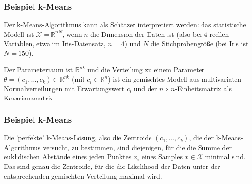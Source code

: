       \begin{frame}
    \frametitle{Beispiel k-Means} 
Der k-Means-Algorithmus kann als Schätzer interpretiert werden:
das statistische Modell ist $\mathcal{X} = \mathbb{R}^{nN}$, wenn $n$ die Dimension der Daten ist (also bei $4$ reellen Variablen, etwa im Iris-Datensatz, $n=4$) und $N$ die Stichprobengröße (bei Iris ist $N=150$).

Der Parameterraum ist $\mathbb{R}^{nk}$ und die Verteilung zu einem Parameter $\theta = (c_1,\dots,c_k) \in \mathbb{R}^{nk}$ (mit $c_i \in \mathbb{R}^n$) ist ein gemischtes Modell aus multivariaten Normalverteilungen mit Erwartungswert $c_i$ und der $n\times n$-Einheitsmatrix als Kovarianzmatrix.
  \end{frame}

  
      \begin{frame}
    \frametitle{Beispiel k-Means} 
Die 'perfekte' k-Means-Lösung, also die Zentroide $(c_1,\dots,c_k)$, die der k-Means-Algorithmus versucht, zu bestimmen, sind diejenigen, für die die Summe der euklidischen Abstände eines jeden Punktes $x_i$ eines Samples $x \in \mathcal{X}$ minimal sind. Das sind genau die Zentroide, für die die Likelihood der Daten unter der entsprechenden gemischten Verteilung maximal wird.
\end{frame}

  



